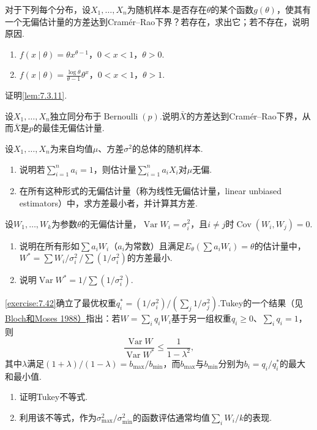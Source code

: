 \begin{exercise}\label{exercise:7.38}
对于下列每个分布，设$X_1,\ldots,X_n$为随机样本.是否存在$\theta$的某个函数$g(\theta)$，使其有一个无偏估计量的方差达到Cramér--Rao下界？若存在，求出它；若不存在，说明原因.
\begin{enumerate}[label=(\alph*)]
\item $f(x\mid\theta)=\theta x^{\theta-1}$，$0<x<1$，$\theta>0$.
\item $f(x\mid\theta)=\frac{\log\theta}{\theta-1}\theta^x$，$0<x<1$，$\theta>1$.
\end{enumerate}
\end{exercise}
\begin{exercise}\label{exercise:7.39}
证明\autoref{lem:7.3.11}.
\end{exercise}
\begin{exercise}\label{exercise:7.40}
设$X_1,\ldots,X_n$独立同分布于$\operatorname{Bernoulli}(p)$.说明$\bar X$的方差达到Cramér--Rao下界，从而$\bar X$是$p$的最佳无偏估计量.
\end{exercise}
\begin{exercise}\label{exercise:7.41}
设$X_1,\ldots,X_n$为来自均值$\mu$、方差$\sigma^2$的总体的随机样本.
\begin{enumerate}[label=(\alph*)]
\item 说明若$\sum_{i=1}^na_i=1$，则估计量$\sum_{i=1}^na_iX_i$对$\mu$无偏.
\item 在所有这种形式的无偏估计量（称为线性无偏估计量，linear unbiased estimators）中，求方差最小者，并计算其方差.
\end{enumerate}
\end{exercise}
\begin{exercise}\label{exercise:7.42}
设$W_1,\ldots,W_k$为参数$\theta$的无偏估计量，$\operatorname{Var}W_i=\sigma_i^2$，且$i\ne j$时$\operatorname{Cov}(W_i,W_j)=0$.
\begin{enumerate}[label=(\alph*)]
\item 说明在所有形如$\sum a_iW_i$（$a_i$为常数）且满足$E_\theta(\sum a_iW_i)=\theta$的估计量中，$W^*=\sum W_i/\sigma_i^2\,/\sum(1/\sigma_i^2)$的方差最小.
\item 说明$\operatorname{Var}W^*=1/\sum(1/\sigma_i^2)$.
\end{enumerate}
\end{exercise}
\begin{exercise}\label{exercise:7.43}
\autoref{exercise:7.42}确立了最优权重$q_i^*=(1/\sigma_i^2)/(\sum_j1/\sigma_j^2)$.Tukey的一个结果（见\hyperref[bib:source38]{Bloch和Moses 1988）}指出：若$W=\sum_iq_iW_i$基于另一组权重$q_i\ge0$、$\sum_iq_i=1$，则
$$\frac{\operatorname{Var}W}{\operatorname{Var}W^*}\le\frac1{1-\lambda^2},$$
其中$\lambda$满足$(1+\lambda)/(1-\lambda)=b_{\max}/b_{\min}$，而$b_{\max}$与$b_{\min}$分别为$b_i=q_i/q_i^*$的最大和最小值.
\begin{enumerate}[label=(\alph*)]
\item 证明Tukey不等式.
\item 利用该不等式，作为$\sigma_{\max}^2/\sigma_{\min}^2$的函数评估通常均值$\sum_iW_i/k$的表现.
\end{enumerate}
\end{exercise}
